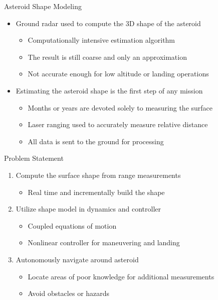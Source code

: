 \documentclass[11pt,professionalfonts]{beamer}
\begin{document}
\begin{frame}{Asteroid Shape Modeling}
    \begin{itemize}
        \item<1-> Ground radar used to compute the 3D shape of the asteroid
        \begin{itemize}
            \item Computationally intensive estimation algorithm 
            \item The result is still coarse and only an approximation
            \item Not accurate enough for low altitude or landing operations
        \end{itemize}
    \item<2-> Estimating the asteroid shape is the first step of any mission
    \begin{itemize}
        \item Months or years are devoted solely to measuring the surface
        \item Laser ranging used to accurately measure relative distance
        \item All data is sent to the ground for processing
    \end{itemize}
    \end{itemize}
    
\end{frame}

\begin{frame}{Problem Statement}
\begin{enumerate}
    \item<1-> Compute the surface shape from range measurements
        \begin{itemize}
            \item Real time and incrementally build the shape
        \end{itemize}
    \item<2-> Utilize shape model in dynamics and controller
        \begin{itemize}
            \item Coupled equations of motion 
            \item Nonlinear controller for maneuvering and landing
        \end{itemize}
    \item<3-> Autonomously navigate around asteroid 
        \begin{itemize}
            \item Locate areas of poor knowledge for additional measurements
            \item Avoid obstacles or hazards
        \end{itemize}
\end{enumerate}
\end{frame}
\end{document}
